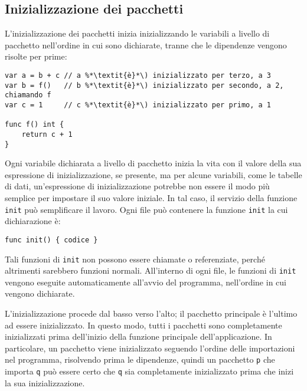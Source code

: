 \subsection{Inizializzazione dei pacchetti}
\label{subsec:inizializzazione_dei_pacchetti}%
L'inizializzazione dei pacchetti inizia inizializzando le variabili a livello di pacchetto nell'ordine in cui sono dichiarate, tranne che le dipendenze vengono risolte per prime:
\begin{lstlisting}[frame=single, label={lst:lstlisting1-5-1.1}]
var a = b + c // a %*\textit{è}*\) inizializzato per terzo, a 3
var b = f()   // b %*\textit{è}*\) inizializzato per secondo, a 2, chiamando f
var c = 1     // c %*\textit{è}*\) inizializzato per primo, a 1

func f() int {
    return c + 1
}
\end{lstlisting}
Ogni variabile dichiarata a livello di pacchetto inizia la vita con il valore della sua espressione di inizializzazione, se presente, ma per alcune variabili, come le tabelle di dati, un'espressione di inizializzazione potrebbe non essere il modo più semplice per impostare il suo valore iniziale.
In tal caso, il servizio della funzione \verb|init| può semplificare il lavoro.
Ogni file può contenere la funzione \verb|init| la cui dichiarazione è:
\begin{lstlisting}[label={lst:lstlisting1-5-1.2}]
func init() { codice }
\end{lstlisting}
Tali funzioni di \verb|init| non possono essere chiamate o referenziate, perché altrimenti sarebbero funzioni normali.
All'interno di ogni file, le funzioni di \verb|init| vengono eseguite automaticamente all'avvio del programma, nell'ordine in cui vengono dichiarate.

L'inizializzazione procede dal basso verso l'alto;
il pacchetto principale è l'ultimo ad essere inizializzato.
In questo modo, tutti i pacchetti sono completamente inizializzati prima dell'inizio della funzione principale dell'applicazione.
In particolare, un pacchetto viene inizializzato seguendo l'ordine delle importazioni nel programma, risolvendo prima le dipendenze, quindi un pacchetto \verb|p| che importa \verb|q| può essere certo che \verb|q| sia completamente inizializzato prima che inizi la sua inizializzazione.

